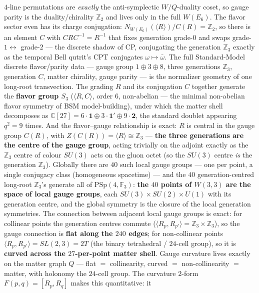 \documentclass[11pt]{article}
\newcommand{\W}{W(3,3)}
\newcommand{\GF}[1]{\mathbb{F}_{#1}}
\newcommand{\PSp}{\mathrm{PSp}}
\begin{document}
$4$-line permutations are \emph{exactly} the anti-symplectic
$W/Q$-duality coset, so gauge parity is the duality/chirality
$\mathbb{Z}_2$ and lives only in the full $W(E_6)$.  The flavor
sector even has its charge conjugation: $N_{W(E_6)}(\langle R\rangle)
/C(R)=\mathbb{Z}_2$, so there is an element $C$ with $CRC^{-1}=R^{-1}$
that fixes generation grade-$0$ and swaps grade-$1\leftrightarrow$
grade-$2$ --- the discrete shadow of CP, conjugating the generation
$\mathbb{Z}_3$ exactly as the temporal Bell qutrit's CPT conjugates
$\omega\mapsto\bar\omega$.  The full Standard-Model discrete
flavor/parity data --- gauge group $1\oplus3\oplus8$, three
generations $\mathbb{Z}_3$, generation $C$, matter chirality, gauge
parity --- is the normalizer geometry of one long-root transvection.
The grading $R$ and its conjugation $C$ together generate the
\textbf{flavor group $S_3$} ($\langle R,C\rangle$, order $6$,
non-abelian --- the minimal non-abelian flavor symmetry of BSM
model-building), under which the matter shell decomposes as
$\mathbb{C}[27]=6\cdot\mathbf{1}\oplus3\cdot\mathbf{1'}\oplus
9\cdot\mathbf{2}$, the standard doublet appearing $q^2=9$ times.
And the flavor--gauge relationship is exact: $R$ is central in the
gauge group $C(R)$, with $Z(C(R))=\langle R\rangle\cong\mathbb{Z}_3$
--- \textbf{the three generations are the centre of the gauge group},
acting trivially on the adjoint exactly as the $\mathbb{Z}_3$ centre
of colour $SU(3)$ acts on the gluon octet (so the $SU(3)$ centre
\emph{is} the generation $\mathbb{Z}_3$).  Globally there are $40$
such local gauge groups --- one per point, a single conjugacy class
(homogeneous spacetime) --- and the $40$ generation-centred long-root
$\mathbb{Z}_3$'s generate all of $\PSp(4,\GF3)$: \textbf{the $40$
points of $\W$ are the space of local gauge groups}, each
$SU(3){\times}SU(2){\times}U(1)$ with its generation centre, and the
global symmetry is the closure of the local generation symmetries.
The connection between adjacent local gauge groups is exact: for
collinear points the generation centres commute
($\langle R_p,R_{p'}\rangle=\mathbb{Z}_3\times\mathbb{Z}_3$), so the
gauge connection is \textbf{flat along the $240$ edges}; for
non-collinear points $\langle R_p,R_{p'}\rangle=SL(2,3)=2T$ (the
binary tetrahedral / $24$-cell group), so it is \textbf{curved across
the $27$-per-point matter shell}.  Gauge curvature lives exactly on
the matter graph $Q$ --- flat $=$ collinearity, curved $=$
non-collinearity $=$ matter, with holonomy the $24$-cell group.
The curvature $2$-form $F(p,q)=[R_p,R_q]$ makes this quantitative: it
\end{document}

